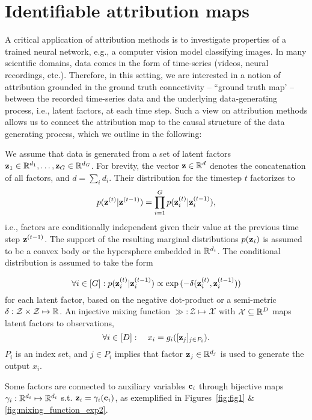 \section{Identifiable attribution maps} \label{sec:attribution-maps}

    A critical application of attribution methods is to investigate properties of a trained neural network, e.g., a computer vision model classifying images. In many scientific domains, data comes in the form of time-series (videos, neural recordings, etc.). Therefore, in this setting, we are interested in a notion of attribution grounded in the ground truth connectivity -- ``ground truth map' -- between the recorded time-series data and the underlying data-generating process, i.e., latent factors, at each time step.
    Such a view on attribution methods allows us to connect the attribution map to the causal structure of the data generating process, which we outline in the following:

    \begin{definition} \label{def:data-generator}
        We assume that data is generated from a set of latent factors $\mathbf{z}_1 \in \mathbb{R}^{d_1}, \dots, \mathbf{z}_{G} \in \mathbb{R}^{d_G}$.
        For brevity, the vector $\mathbf{z} \in \mathbb{R}^d$ denotes the concatenation of all factors, and $d = \sum_i d_i$.
        Their distribution for the timestep $t$ factorizes to
        \begin{align}
            p(\zz^{(t)} | \zz^{(t-1)}) = %
            \prod_{i=1}^G p(\zz^{(t)}_i | \zz_i^{(t-1)}), 
        \end{align}
        i.e., factors are conditionally independent given their value at the previous time step $\mathbf{z}^{(t-1)}$.
        The support of the resulting marginal distributions $p(\mathbf{z}_i)$ is assumed to be a convex body or the hypersphere embedded in $\mathbb{R}^{d_i}$.
        The conditional distribution is assumed to take the form

        \begin{equation}
            \forall i\in[G]:
                p(\mathbf{z}^{(t)}_i | \mathbf{z}_i^{(t-1)})
                \propto \exp{(-\delta(\mathbf{z}^{(t)}_i, \mathbf{z}^{(t-1)}_i))}
        \end{equation}
        for each latent factor,
        based on the negative dot-product or a semi-metric $\delta: \mathcal Z \times \mathcal Z \mapsto \mathbb{R}$. 
        An injective mixing function $\gg: \mathcal{Z} \mapsto \mathcal{X}$ with $\mathcal{X} \subseteq \mathbb{R}^D$ maps latent factors to observations,
        \begin{equation}\label{eq:mixing}
            \forall i \in [D]: \quad
                x_i = g_i([\mathbf{z}_j]_{j\in P_i}).
        \end{equation}
        $P_i$ is an index set, and $j \in P_i$ implies that factor $\mathbf{z}_j \in \mathbb{R}^{d_j}$ is used to generate the output $x_i$.
      
        Some factors are connected to auxiliary variables $\mathbf{c}_i$ through bijective maps $\gamma_i: \mathbb{R}^{d_i} \mapsto \mathbb{R}^{d_i}$ s.t. $\mathbf{z}_i = \gamma_i(\mathbf{c}_i)$, as exemplified in Figures~\ref{fig:fig1} \& \ref{fig:mixing_function_exp2}.
    \end{definition} 

